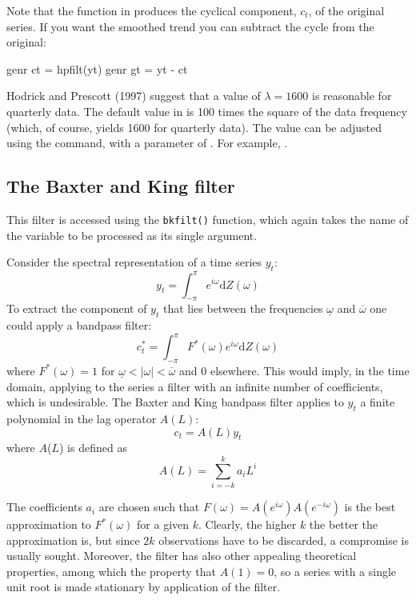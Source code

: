 Note that the  function in  produces the
cyclical component, $c_t$, of the original series.  If you want the
smoothed trend you can subtract the cycle from the original:

\begin{code}
genr ct = hpfilt(yt)
genr gt = yt - ct
\end{code}

Hodrick and Prescott (1997) suggest that a value of $\lambda = 1600$
is reasonable for quarterly data.  The default value in  is
100 times the square of the data frequency (which, of course, yields
1600 for quarterly data).  The value can be adjusted using the
 command, with a parameter of .  For example,
.


\subsection{The Baxter and King filter}
\label{baxter-king}

This filter is accessed using the \verb+bkfilt()+ function, which
again takes the name of the variable to be processed as its single
argument.

Consider the spectral representation of a time series $y_t$:
%       
\[ y_t = \int_{-\pi}^{\pi} e^{i\omega} \mathrm{d} Z(\omega) \]
%
To extract the component of $y_t$ that lies between the frequencies
$\underline{\omega}$ and $\overline{\omega}$ one could apply a
bandpass filter:
%       
\[ c^*_t = \int_{-\pi}^{\pi} F^*(\omega) e^{i\omega} \mathrm{d}
Z(\omega) \]
%
where $F^*(\omega) = 1$ for $\underline{\omega} < |\omega| <
\overline{\omega}$ and 0 elsewhere. This would imply, in the time
domain, applying to the series a filter with an infinite number of
coefficients, which is undesirable. The Baxter and King bandpass
filter applies to $y_t$ a finite polynomial in the lag
operator $A(L)$:
%       
\[ c_t = A(L) y_t \]
%
where $A$($L$) is defined as
%       
\[ A(L) = \sum_{i=-k}^{k} a_i L^i \]

The coefficients $a_i$ are chosen such that $F(\omega)
= A(e^{i\omega})A(e^{-i\omega})$ is the best approximation to
$F^*(\omega)$ for a given $k$. Clearly, the higher $k$ the better the
approximation is, but since $2k$ observations have to be discarded, a
compromise is usually sought. Moreover, the filter has also other
appealing theoretical properties, among which the property that $A(1)
= 0$, so a series with a single unit root is made stationary by
application of the filter.

